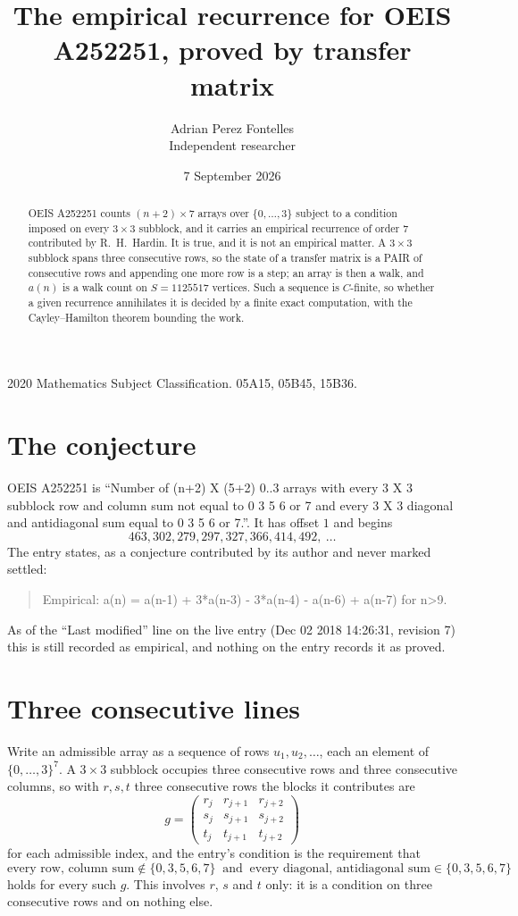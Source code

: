 \documentclass[11pt,a4paper]{article}
\title{The empirical recurrence for OEIS A252251, proved by transfer matrix}
\author{Adrian Perez Fontelles\\ \small Independent researcher}
\date{7 September 2026}
\theoremstyle{plain}
\theoremstyle{definition}
\begin{document}
\maketitle

\begin{abstract}
OEIS A252251 counts $(n+2)\times7$ arrays over $\{0,\dots,3\}$ subject to a condition imposed on
every $3\times3$ subblock, and it carries an empirical recurrence of order $7$
contributed by R.~H.~Hardin. It is true, and it is not an empirical matter. A $3\times3$
subblock spans three consecutive rows, so the state of a transfer matrix is a PAIR of
consecutive rows and appending one more row is a step; an array is then a walk, and
$a(n)$ is a walk count on $S=1125517$ vertices. Such a sequence is $C$-finite, so whether a given
recurrence annihilates it is decided by a finite exact computation, with the Cayley--Hamilton
theorem bounding the work.
\end{abstract}

\noindent\small 2020 Mathematics Subject Classification. 05A15, 05B45, 15B36.\normalsize

\section{The conjecture}

OEIS A252251 is ``Number of (n+2) X (5+2) 0..3 arrays with every 3 X 3 subblock row and column sum not equal to 0 3 5 6 or 7 and every 3 X 3 diagonal and antidiagonal sum equal to 0 3 5 6 or 7.''. It has offset $1$ and begins
\[
463, 302, 279, 297, 327, 366, 414, 492,\ \dots
\]
The entry states, as a conjecture contributed by its author and never marked settled:
\begin{quote}
Empirical: a(n) = a(n-1) + 3*a(n-3) - 3*a(n-4) - a(n-6) + a(n-7) for n>9.
\end{quote}
As of the ``Last modified'' line on the live entry (Dec 02 2018 14:26:31, revision 7) this is still
recorded as empirical, and nothing on the entry records it as proved.

\section{Three consecutive lines}

Write an admissible array as a sequence of rows $u_1,u_2,\dots$, each an element of
$\{0,\dots,3\}^{7}$. A $3\times3$ subblock occupies three consecutive rows and
three consecutive columns, so with $r,s,t$ three consecutive rows the blocks it
contributes are
\[
g=\begin{pmatrix}r_j&r_{j+1}&r_{j+2}\\ s_j&s_{j+1}&s_{j+2}\\ t_j&t_{j+1}&t_{j+2}\end{pmatrix}
\]
for each admissible index, and the entry's condition is the requirement that
\[
\text{every row, column sum} \notin \{0,3,5,6,7\}\ \text{ and }\ \text{every diagonal, antidiagonal sum} \in \{0,3,5,6,7\}
\]
holds for every such $g$. This involves $r$, $s$ and $t$ only: it is a condition on
three consecutive rows and on nothing else.
\end{document}
